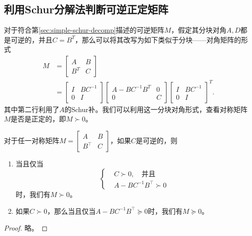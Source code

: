 \begin{subappendices}
\subsection{利用Schur分解法判断可逆正定矩阵}
对于符合第\ref{sec:simple-schur-decomp}描述的可逆矩阵$M$，假定其分块对角$A,D$都是可逆的，并且$C=B^T$，那么可以将其改写为如下类似于分块——对角矩阵的形式
\begin{equation}
  \label{eq:simple-schulr-howto-M}
  \begin{split}
  M &= \begin{bmatrix}
  A & B \\ B^T & C
  \end{bmatrix} \\
  &= \begin{bmatrix}
  I & BC^{-1} \\
  0 & I
  \end{bmatrix}
  \begin{bmatrix}
    A - BC^{-1}B^T & 0 \\
    0 & C
  \end{bmatrix}
  \begin{bmatrix}
    I & BC^{-1} \\
    0 & I
  \end{bmatrix}^{T}.
\end{split}
\end{equation}
其中第二行利用了$A$的Schur补。我们可以利用这一分块对角形式，查看对称矩阵$M$是否是正定的，即$M \succ 0$。

\begin{proposition}
  对于任一对称矩阵$M = \begin{bmatrix}
  A & B \\ B^{\top} &C \end{bmatrix} $，如果$C$是可逆的，则
  \begin{enumerate}
    \item 当且仅当\begin{equation*}
    \begin{cases}
      &C \succ 0, \quad \text{并且}\\
      &A-BC^{-1}B^{\top} \succ 0
    \end{cases}
    \end{equation*}时，我们有$M \succ 0$。
    \item 如果$C \succ 0$，那么当且仅当$A-BC^{-1}B^{\top} \succeq 0$时，我们有$M \succeq 0$。
  \end{enumerate}
\end{proposition}
\begin{proof}
  略。
\end{proof}


\end{subappendices}
